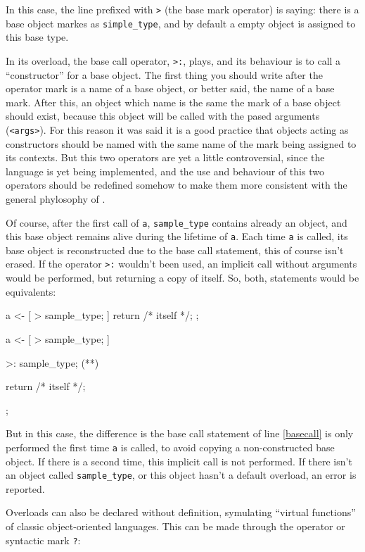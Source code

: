 \documentclass{article}
\begin{document}
In this case, the line prefixed with \texttt{>} (the base mark operator) is
saying: there is a base object markes as \texttt{simple\_type}, and by default a
empty object is assigned to this base type.

In its overload, the base call operator, \texttt{>:}, plays, and its behaviour
is to call a ``constructor'' for a base object. The first thing you should write
after the operator mark is a name of a base object, or better said, the name of
a base mark. After this, an object which name is the same the mark of a base
object should exist, because this object will be called with the pased arguments
(\texttt{<args>}). For this reason it was said it is a good practice that
objects acting as constructors should be named with the same name of the mark
being assigned to its contexts. But this two operators are yet a little
controversial, since the language is yet being implemented, and the use and
behaviour of this two operators should be redefined somehow to make them more
consistent with the general phylosophy of \faupp.

Of course, after the first call of \texttt{a}, \texttt{sample\_type} contains
already an object, and this base object remains alive during the lifetime of
\texttt{a}. Each time \texttt{a} is called, its base object is reconstructed due
to the base call statement, this of course isn't erased. If the operator
\texttt{>:} wouldn't been used, an implicit call without arguments would be
performed, but returning a copy of itself. So, both, statements would be
equivalents:

\begin{faupp2}
  a <- [ > sample_type; ]
       {  return /* itself */; };

  a <- [ > sample_type; ]
       {
         >: sample_type; (*\label{basecall}*)

         return /* itself */;
       };
\end{faupp2}

But in this case, the difference is the base call statement of line
\ref{basecall} is only performed the first time \texttt{a} is called, to avoid
copying a non-constructed base object. If there is a second time, this implicit
call is not performed. If there isn't an object called \texttt{sample\_type}, or
this object hasn't a default overload, an error is reported.

Overloads can also be declared without definition, symulating ``virtual
functions'' of classic object-oriented languages. This can be made through the
operator or syntactic mark \texttt{?}:
\end{document}
